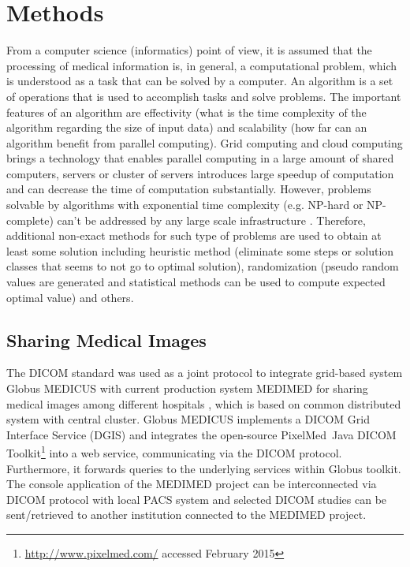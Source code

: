 \chapter{Methods}

From a computer science (informatics) point of view, it is assumed that the processing of medical information is, in general, a computational problem, which is understood as a task that can be solved by a computer. An algorithm is a set of operations that is used to accomplish tasks and solve problems. 
The important features of an algorithm are effectivity (what is the time complexity of the algorithm regarding the size of input data) and scalability (how far can an algorithm benefit from parallel computing). Grid computing and cloud computing brings a technology that enables parallel computing in a large amount of shared computers, servers or cluster of servers introduces large speedup of computation and can decrease the time of computation substantially. However, problems solvable by algorithms with exponential time complexity (e.g. NP-hard or NP-complete) can't be addressed by any large scale infrastructure \cite{Garey1979}. Therefore, additional non-exact methods for such type of problems are used to obtain at least some solution including heuristic method (eliminate some steps or solution classes that seems to not go to optimal solution), randomization (pseudo random values are generated and statistical methods can be used to compute expected optimal value) and others. 

\section{Sharing Medical Images}
The DICOM standard was used as a joint protocol to integrate grid-based system Globus MEDICUS \cite{Erberich2006} with current production system MEDIMED for sharing medical images among different hospitals \cite{Slavicek2010}, which is based on common distributed system with central cluster. 
Globus MEDICUS \cite{Erberich2006,Erberich2007} implements a DICOM Grid Interface Service (DGIS) and integrates the open-source PixelMed\texttrademark ~Java DICOM Toolkit\footnote{\url{http://www.pixelmed.com/} accessed February 2015} into a web service, communicating via the DICOM protocol. Furthermore, it forwards queries to the underlying services within Globus toolkit. The console application of the MEDIMED project can be interconnected via DICOM protocol with local PACS system and selected DICOM studies can be sent/retrieved to another institution connected to the MEDIMED project.





